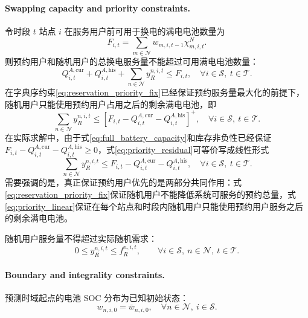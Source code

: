 \documentclass[12pt,hyperref,a4paper,UTF8]{ctexart}
\begin{document}
\paragraph{Swapping capacity and priority constraints.}
令时段 $t$ 站点 $i$ 在服务用户前可用于换电的满电电池数量为
\begin{equation}
F_{i,t}=\sum_{m\in\mathcal{N}}w_{m,i,t-1}\chi_{m,i,t}^{N}.
\label{eq:available_full_batteries}
\end{equation}
则预约用户和随机用户的总换电服务量不能超过可用满电电池数量：
\begin{equation}
Q_{i,t}^{A,\mathrm{cur}}+Q_{i,t}^{A,\mathrm{his}}+
\sum_{n\in\mathcal{N}}y_R^{n,i,t}
\le F_{i,t},
\quad \forall i\in\mathcal{S},\ t\in\mathcal{T}.
\label{eq:full_battery_capacity}
\end{equation}
在字典序约束\eqref{eq:reservation_priority_fix}已经保证预约服务量最大化的前提下，随机用户只能使用预约用户占用之后的剩余满电电池，即
\begin{equation}
\sum_{n\in\mathcal{N}}y_R^{n,i,t}
\le
\left[F_{i,t}-Q_{i,t}^{A,\mathrm{cur}}-Q_{i,t}^{A,\mathrm{his}}\right]^+,
\quad \forall i\in\mathcal{S},\ t\in\mathcal{T}.
\label{eq:priority_residual}
\end{equation}
在实际求解中，由于式\eqref{eq:full_battery_capacity}和库存非负性已经保证 $F_{i,t}-Q_{i,t}^{A,\mathrm{cur}}-Q_{i,t}^{A,\mathrm{his}}\ge 0$，式\eqref{eq:priority_residual}可等价写成线性形式
\begin{equation}
\sum_{n\in\mathcal{N}}y_R^{n,i,t}
\le
F_{i,t}-Q_{i,t}^{A,\mathrm{cur}}-Q_{i,t}^{A,\mathrm{his}},
\quad \forall i\in\mathcal{S},\ t\in\mathcal{T}.
\label{eq:priority_linear}
\end{equation}
需要强调的是，真正保证预约用户优先的是两部分共同作用：式\eqref{eq:reservation_priority_fix}保证随机用户不能降低系统可服务的预约总量，式\eqref{eq:priority_linear}保证在每个站点和时段内随机用户只能使用预约用户服务之后的剩余满电电池。

随机用户服务量不得超过实际随机需求：
\begin{equation}
0\le y_R^{n,i,t}\le f_R^{n,i,t},
\qquad
\forall i\in \mathcal{S},\ n\in \mathcal{N},\ t\in \mathcal{T}.
\label{eq:random_bound}
\end{equation}

\paragraph{Boundary and integrality constraints.}
预测时域起点的电池 SOC 分布为已知初始状态：
\begin{equation}
w_{n,i,0}=\bar{w}_{n,i,0},
\quad \forall n\in \mathcal{N},\ i\in \mathcal{S}.
\label{eq:initial_inventory}
\end{equation}
\end{document}
